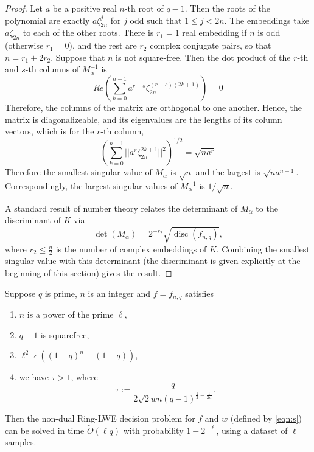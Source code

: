 \documentclass{llncs}
\newcommand{\<}{\langle}
\renewcommand{\>}{\rangle}
\begin{document}
        \begin{proof}
                Let $a$ be a positive real $n$-th root of $q-1$.  Then the roots of the polynomial are exactly $a \zeta_{2n}^j$ for $j$ odd such that $1 \le j < 2n$.  The embeddings take $a\zeta_{2n}$ to each of the other roots.  There is $r_1=1$ real embedding if $n$ is odd (otherwise $r_1=0$), and the rest are $r_2$ complex conjugate pairs, so that $n = r_1 + 2r_2$.
                Suppose that $n$ is not square-free.  Then the dot product of the $r$-th and $s$-th columns of $M_\alpha^{-1}$ is
                \[
                        Re\left( \sum_{k=0}^{n-1} a^{r+s}\zeta_{2n}^{(r+s)(2k+1)} \right) = 0
                \]
Therefore, the columns of the matrix are orthogonal to one another.  Hence, the matrix is diagonalizeable, and its eigenvalues are the lengths of its column vectors, which is for the $r$-th column,
\[
        \left( \sum_{k=0}^{n-1} || a^r \zeta_{2n}^{2k+1} ||^2 \right)^{1/2} = \sqrt{ na^r }
\]
Therefore the smallest singular value of $M_\alpha$ is $\sqrt{n}$ and the largest is $\sqrt{na^{n-1}}$.  Correspondingly, the largest singular values of $M_\alpha^{-1}$ is $1/\sqrt{n}$.

A standard result of number theory relates the determinant of $M_\alpha$ to the discriminant of $K$ via
\[
        \operatorname{det}(M_\alpha) = 2^{-r_2}\sqrt{\operatorname{disc}(f_{n,q})},
\]
where $r_2 \le \frac{n}{2}$ is the number of complex embeddings of $K$.
Combining the smallest singular value with this determinant (the discriminant is given explicitly at the beginning of this section) gives the result.
        \end{proof}


        \begin{theorem}
                Suppose $q$ is prime, $n$ is an integer and $f = f_{n,q}$ satisfies
                \begin{enumerate}
                        \item $n$ is a power of the prime $\ell$,
                        \item $q-1$ is squarefree,
                        \item $\ell^2 \nmid ((1-q)^n-(1-q))$,
                        \item we have $\tau > 1$, where
                                \[
                                        \tau := \frac{  q }{2\sqrt{2} w n(q-1)^{\frac12-\frac{1}{2n}}}.
                                \]
                \end{enumerate}
                Then the non-dual Ring-LWE decision problem for $f$ and $w$ (defined by \eqref{eqn:s}) can be solved in time $\widetilde{O}(\ell q)$ with probability $1 - 2^{-\ell}$, using a dataset of $\ell$ samples.
        \end{theorem}
\end{document}
